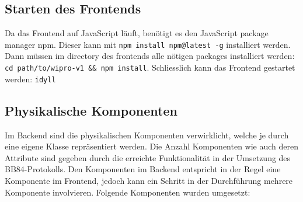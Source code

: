 \documentclass[a4paper,10.2pt,pdftex]{scrartcl}%
\begin{document}
\subsection{Starten des Frontends}
Da das Frontend auf JavaScript läuft, benötigt es den JavaScript package manager npm. Dieser kann mit \texttt{npm install npm@latest -g} installiert werden. Dann müssen im directory des frontends alle nötigen packages installiert werden: \texttt{cd path/to/wipro-v1 && npm install}. Schliesslich kann das Frontend gestartet werden: \texttt{idyll}

\subsection{Physikalische Komponenten}
Im Backend sind die physikalischen Komponenten verwirklicht, welche je durch eine eigene Klasse repräsentiert werden. Die Anzahl Komponenten wie auch deren Attribute sind gegeben durch die erreichte Funktionalität in der Umsetzung des BB84-Protokolls. Den Komponenten im Backend entspricht in der Regel eine Komponente im Frontend, jedoch kann ein Schritt in der Durchführung mehrere Komponente involvieren. Folgende Komponenten wurden umgesetzt:
\end{document}
